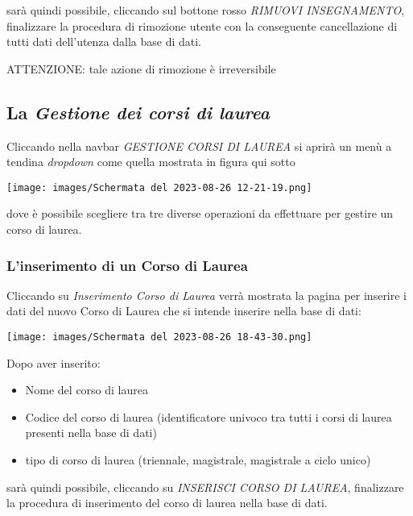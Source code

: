 \documentclass{article}
\newcommand{\alert}[0]{\textcolor{red}{\faExclamationCircle}}
\begin{document}
    sarà quindi possibile, cliccando sul bottone rosso \textit{RIMUOVI INSEGNAMENTO}, finalizzare la procedura di rimozione utente con la conseguente cancellazione di tutti dati dell'utenza dalla base di dati.

    \alert ATTENZIONE: tale azione di rimozione è irreversibile

    \subsection{La \textit{Gestione dei corsi di laurea}}

    Cliccando nella navbar \textit{GESTIONE CORSI DI LAUREA} si aprirà un menù a tendina \textit{dropdown} come quella mostrata in figura qui sotto
    \begin{center}
        \texttt{[image: images/Schermata del 2023-08-26 12-21-19.png]}
    \end{center}
    dove è possibile scegliere tra tre diverse operazioni da effettuare per gestire un corso di laurea.
    \subsubsection{L'inserimento di un Corso di Laurea}
    Cliccando su \textit{Inserimento Corso di Laurea} verrà mostrata la pagina per inserire i dati del nuovo Corso di Laurea che si intende inserire nella base di dati:

    \begin{center}
        \texttt{[image: images/Schermata del 2023-08-26 18-43-30.png]}
    \end{center}
    Dopo aver inserito:
    \begin{itemize}
        \item Nome del corso di laurea
        \item Codice del corso di laurea (identificatore univoco tra tutti i corsi di laurea presenti nella base di dati)
        \item tipo di corso di laurea (triennale, magistrale, magistrale a ciclo unico)
    \end{itemize}
    sarà quindi possibile, cliccando su \textit{INSERISCI CORSO DI LAUREA}, finalizzare la procedura di inserimento del corso di laurea nella base di dati.
\end{document}
